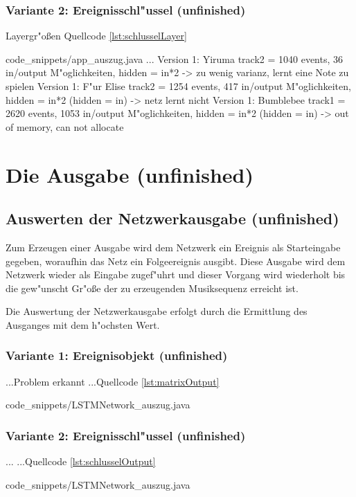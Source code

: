 {\subsubsection{Variante 2: Ereignisschl"ussel (unfinished) }
Layergr"o{\ss}en
Quellcode \ref{lst:schlusselLayer}

{code_snippets/app_auszug.java}
...
Version 1: Yiruma track2 = 1040 events, 36 in/output M"oglichkeiten, hidden = in*2 -> zu wenig varianz, lernt eine Note zu spielen
Version 1: F"ur Elise track2 = 1254 events, 417 in/output M"oglichkeiten, hidden = in*2 (hidden = in) -> netz lernt nicht
Version 1: Bumblebee track1 = 2620 events, 1053 in/output M"oglichkeiten, hidden = in*2 (hidden = in) -> out of memory, can not allocate




\section{Die Ausgabe (unfinished)}
\subsection{Auswerten der Netzwerkausgabe (unfinished)}
Zum Erzeugen einer Ausgabe wird dem Netzwerk ein Ereignis als Starteingabe gegeben, woraufhin das Netz ein Folgeereignis ausgibt. Diese Ausgabe wird dem Netzwerk wieder als Eingabe zugef"uhrt und dieser Vorgang wird wiederholt bis die gew"unscht Gr"o{\ss}e der zu erzeugenden Musiksequenz erreicht ist.

Die Auswertung der Netzwerkausgabe erfolgt durch die Ermittlung des Ausganges mit dem h"ochsten Wert.

\subsubsection{Variante 1: Ereignisobjekt (unfinished)}
...Problem erkannt
...Quellcode \ref{lst:matrixOutput}

{code_snippets/LSTMNetwork_auszug.java}

\subsubsection{Variante 2: Ereignisschl"ussel (unfinished)}
...
...Quellcode \ref{lst:schlusselOutput}

{code_snippets/LSTMNetwork_auszug.java}


}
